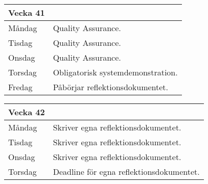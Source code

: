 \documentclass{liu_mall}
\begin{document}
\begin{table}[!h]
    \begin{tabularx}{\textwidth}{l|l}
        Vecka 41\\\hline
        Måndag  & Quality Assurance.\\ %
        Tisdag  & Quality Assurance.\\
        Onsdag  & Quality Assurance.\\
        Torsdag & Obligatorisk systemdemonstration.\\ %
        Fredag  & Påbörjar reflektionsdokumentet.\\ %
    \end{tabularx}
\end{table}

\begin{table}[!h]
    \begin{tabularx}{\textwidth}{l|l}
        Vecka 42\\\hline
        Måndag  & Skriver egna reflektionsdokumentet.\\ %
        Tisdag  & Skriver egna reflektionsdokumentet.\\ %
        Onsdag  & Skriver egna reflektionsdokumentet.\\ %
        Torsdag & Deadline för egna reflektionsdokumentet.\\ %
    \end{tabularx}
\end{table}
\end{document}
